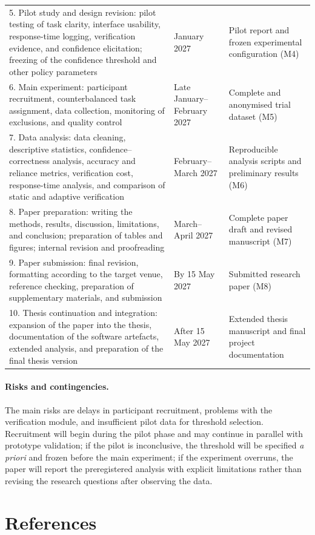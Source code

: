 \documentclass[oneside,final,14pt,a4paper]{extreport}
\begin{document}
\begin{longtable}{p{8.0cm}p{2.4cm}p{5.3cm}}
5. Pilot study and design revision:
pilot testing of task clarity, interface usability, response-time
logging, verification evidence, and confidence elicitation;
freezing of the confidence threshold and other policy parameters &
January 2027 &
Pilot report and frozen experimental configuration (M4) \\

6. Main experiment:
participant recruitment, counterbalanced task assignment,
data collection, monitoring of exclusions, and quality control &
Late January--February 2027 &
Complete and anonymised trial dataset (M5) \\

7. Data analysis:
data cleaning, descriptive statistics, confidence--correctness
analysis, accuracy and reliance metrics, verification cost,
response-time analysis, and comparison of static and adaptive
verification &
February--March 2027 &
Reproducible analysis scripts and preliminary results (M6) \\

8. Paper preparation:
writing the methods, results, discussion, limitations, and conclusion;
preparation of tables and figures; internal revision and proofreading &
March--April 2027 &
Complete paper draft and revised manuscript (M7) \\

9. Paper submission:
final revision, formatting according to the target venue,
reference checking, preparation of supplementary materials,
and submission &
By 15 May 2027 &
Submitted research paper (M8) \\

10. Thesis continuation and integration:
expansion of the paper into the thesis, documentation of the software
artefacts, extended analysis, and preparation of the final thesis version &
After 15 May 2027 &
Extended thesis manuscript and final project documentation \\

\end{longtable}

\paragraph{Risks and contingencies.}
The main risks are delays in participant recruitment, problems with the
verification module, and insufficient pilot data for threshold selection.
Recruitment will begin during the pilot phase and may continue in parallel
with prototype validation; if the pilot is inconclusive, the threshold will be
specified \emph{a priori} and frozen before the main experiment; if the
experiment overruns, the paper will report the preregistered analysis with
explicit limitations rather than revising the research questions after
observing the data.

\section{References}
\printbibliography[heading=none]
\end{document}
